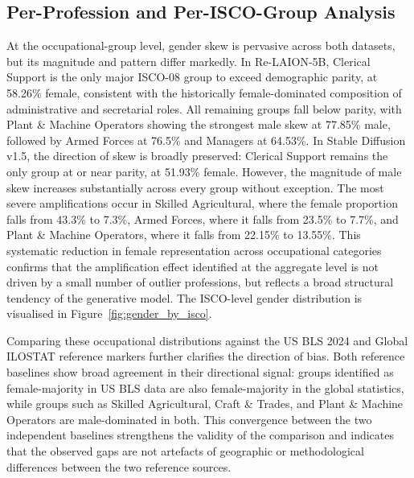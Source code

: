 \subsection{Per-Profession and Per-ISCO-Group Analysis}

At the occupational-group level, gender skew is pervasive across both datasets, but its magnitude and pattern differ markedly. In Re-LAION-5B, Clerical Support is the only major ISCO-08 group to exceed demographic parity, at 58.26\% female, consistent with the historically female-dominated composition of administrative and secretarial roles. All remaining groups fall below parity, with Plant \& Machine Operators showing the strongest male skew at 77.85\% male, followed by Armed Forces at 76.5\% and Managers at 64.53\%. In Stable Diffusion v1.5, the direction of skew is broadly preserved: Clerical Support remains the only group at or near parity, at 51.93\% female. However, the magnitude of male skew increases substantially across every group without exception. The most severe amplifications occur in Skilled Agricultural, where the female proportion falls from 43.3\% to 7.3\%, Armed Forces, where it falls from 23.5\% to 7.7\%, and Plant \& Machine Operators, where it falls from 22.15\% to 13.55\%. This systematic reduction in female representation across occupational categories confirms that the amplification effect identified at the aggregate level is not driven by a small number of outlier professions, but reflects a broad structural tendency of the generative model. The ISCO-level gender distribution is visualised in Figure~\ref{fig:gender_by_isco}.

Comparing these occupational distributions against the US BLS 2024 and Global ILOSTAT reference markers further clarifies the direction of bias. Both reference baselines show broad agreement in their directional signal: groups identified as female-majority in US BLS data are also female-majority in the global statistics, while groups such as Skilled Agricultural, Craft \& Trades, and Plant \& Machine Operators are male-dominated in both. This convergence between the two independent baselines strengthens the validity of the comparison and indicates that the observed gaps are not artefacts of geographic or methodological differences between the two reference sources.

